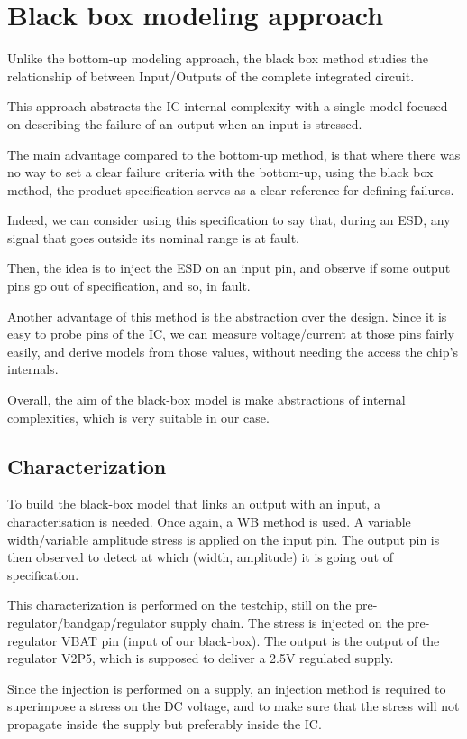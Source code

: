 \section{Black box modeling approach}

Unlike the bottom-up modeling approach, the black box method studies the relationship of
between Input/Outputs of the complete integrated circuit.

This approach abstracts the IC internal complexity with a single model focused on
describing the failure of an output when an input is stressed.

The main advantage compared to the bottom-up method, is that where there was no
way to set a clear failure criteria with the bottom-up, using the black box method, the
product specification serves as a clear reference for defining failures.

Indeed, we can consider using this specification to say that, during an ESD,
any signal that goes outside its nominal range is at fault.

Then, the idea is to inject the ESD on an input pin, and observe if some output
pins go out of specification, and so, in fault.

Another advantage of this method is the abstraction over the design. Since it is
easy to probe pins of the IC, we can measure voltage/current at those pins fairly
easily, and derive models from those values, without needing the access the chip's internals.

Overall, the aim of the black-box model is make abstractions of internal complexities, which is very suitable in our case.

\subsection{Characterization}
To build the black-box model that links an output with an input, a characterisation is needed.
Once again, a WB method is used. A variable width/variable amplitude stress is applied on the input pin.
The output pin is then observed to detect at which (width, amplitude) it is going out of specification.

This characterization is performed on the testchip, still on the pre-regulator/bandgap/regulator supply chain.
The stress is injected on the pre-regulator VBAT pin (input of our black-box).
The output is the output of the regulator V2P5, which is supposed to deliver a 2.5V regulated supply.

Since the injection is performed on a supply, an injection method is required to superimpose a stress on the DC voltage,
and to make sure that the stress will not propagate inside the supply but preferably inside the IC.

